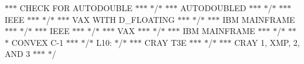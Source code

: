 \begin{DoxyItemize}
\item $\ast$$\ast$$\ast$ C\+H\+E\+C\+K F\+O\+R A\+U\+T\+O\+D\+O\+U\+B\+L\+E $\ast$$\ast$$\ast$ $\ast$/$\ast$ $\ast$$\ast$$\ast$ A\+U\+T\+O\+D\+O\+U\+B\+L\+E\+D $\ast$$\ast$$\ast$ $\ast$/$\ast$ $\ast$$\ast$$\ast$ I\+E\+E\+E $\ast$$\ast$$\ast$ $\ast$/$\ast$ $\ast$$\ast$$\ast$ V\+A\+X W\+I\+T\+H D\+\_\+\+F\+L\+O\+A\+T\+I\+N\+G $\ast$$\ast$$\ast$ $\ast$/$\ast$ $\ast$$\ast$$\ast$ I\+B\+M M\+A\+I\+N\+F\+R\+A\+M\+E $\ast$$\ast$$\ast$ $\ast$/$\ast$ $\ast$$\ast$$\ast$ I\+E\+E\+E $\ast$$\ast$$\ast$ $\ast$/$\ast$ $\ast$$\ast$$\ast$ V\+A\+X $\ast$$\ast$$\ast$ $\ast$/$\ast$ $\ast$$\ast$$\ast$ I\+B\+M M\+A\+I\+N\+F\+R\+A\+M\+E $\ast$$\ast$$\ast$ $\ast$/$\ast$ $\ast$$\ast$$\ast$ C\+O\+N\+V\+E\+X C-\/1 $\ast$$\ast$$\ast$ $\ast$/$\ast$ L10\+: $\ast$/$\ast$ $\ast$$\ast$$\ast$ C\+R\+A\+Y T3\+E $\ast$$\ast$$\ast$ $\ast$/$\ast$ $\ast$$\ast$$\ast$ C\+R\+A\+Y 1, X\+M\+P, 2, A\+N\+D 3 $\ast$$\ast$$\ast$ $\ast$/ 
\end{DoxyItemize}\hypertarget{namespaceport_a31c99d02814a98ce37ffd3eedf6e5267}{
}
